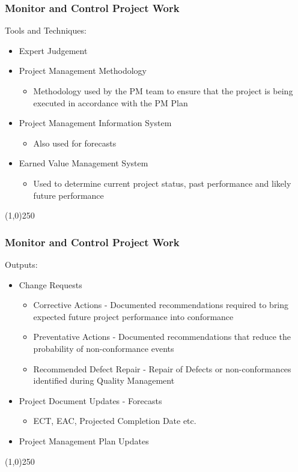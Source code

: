\begin{frame}
\frametitle{Monitor and Control Project Work}
Tools and Techniques:
\begin{itemize}
	\item Expert Judgement
	\item Project Management Methodology
		\begin{itemize}
			\item Methodology used by the PM team to ensure that the project is being executed in accordance with the PM Plan
		\end{itemize}
	\item Project Management Information System
		\begin{itemize}
			\item Also used for forecasts
		\end{itemize}
	\item Earned Value Management System
		\begin{itemize}
			\item Used to determine current project status, past performance and likely future performance 
		\end{itemize}
\end{itemize}
 
\end{frame}\begin{center}\line(1,0){250}\end{center}
%
%

\begin{frame}
\frametitle{Monitor and Control Project Work}
Outputs:
\begin{itemize}
	\item Change Requests
		\begin{itemize}
			\item Corrective Actions - Documented recommendations required to bring expected future project performance into conformance
			\item Preventative Actions - Documented recommendations that reduce the probability of non-conformance events
			\item Recommended Defect Repair - Repair of Defects or non-conformances identified during Quality Management
		\end{itemize}
	\item Project Document Updates - Forecasts
		\begin{itemize}
			\item ECT, EAC, Projected Completion Date etc.
		\end{itemize}
	\item Project Management Plan Updates
\end{itemize}
\end{frame}\begin{center}\line(1,0){250}\end{center}
%
%




